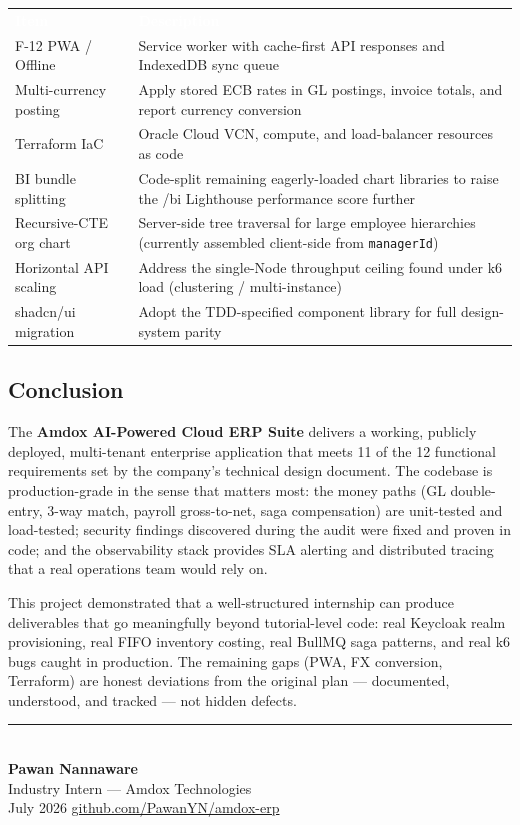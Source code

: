 \documentclass[11pt,a4paper]{article}
\newcommand{\code}[1]{\texttt{\small #1}}
\begin{document}
\begin{table}[H]
\centering\small
\renewcommand{\arraystretch}{1.25}
\begin{tabularx}{\textwidth}{l X}
\toprule
\rowcolor{amdoxnavy}
\textcolor{white}{\textbf{Item}} & \textcolor{white}{\textbf{Description}} \\
F-12 PWA / Offline & Service worker with cache-first API responses and IndexedDB sync queue \\
\rowcolor{amdoxlight}
Multi-currency posting & Apply stored ECB rates in GL postings, invoice totals, and report currency conversion \\
Terraform IaC & Oracle Cloud VCN, compute, and load-balancer resources as code \\
\rowcolor{amdoxlight}
BI bundle splitting & Code-split remaining eagerly-loaded chart libraries to raise the /bi Lighthouse performance score further \\
\rowcolor{amdoxlight}
Recursive-CTE org chart & Server-side tree traversal for large employee hierarchies (currently assembled client-side from \code{managerId}) \\
Horizontal API scaling & Address the single-Node throughput ceiling found under k6 load (clustering / multi-instance) \\
\rowcolor{amdoxlight}
shadcn/ui migration & Adopt the TDD-specified component library for full design-system parity \\
\bottomrule
\end{tabularx}
\end{table}

\subsection{Conclusion}

The \textbf{Amdox AI-Powered Cloud ERP Suite} delivers a working, publicly deployed,
multi-tenant enterprise application that meets 11 of the 12 functional requirements
set by the company's technical design document. The codebase is production-grade in
the sense that matters most: the money paths (GL double-entry, 3-way match, payroll
gross-to-net, saga compensation) are unit-tested and load-tested; security findings
discovered during the audit were fixed and proven in code; and the observability stack
provides SLA alerting and distributed tracing that a real operations team would rely on.

This project demonstrated that a well-structured internship can produce deliverables
that go meaningfully beyond tutorial-level code: real Keycloak realm provisioning,
real FIFO inventory costing, real BullMQ saga patterns, and real k6 bugs caught in
production. The remaining gaps (PWA, FX conversion, Terraform) are honest deviations
from the original plan --- documented, understood, and tracked --- not hidden defects.

\vspace{1.5cm}
\noindent\rule{0.5\textwidth}{0.4pt}\\[0.3cm]
\textbf{Pawan Nannaware} \\
{\small Industry Intern --- Amdox Technologies \\
July 2026 \;\textbullet\; \href{https://github.com/PawanYN/amdox-erp}{github.com/PawanYN/amdox-erp}}
\end{document}
